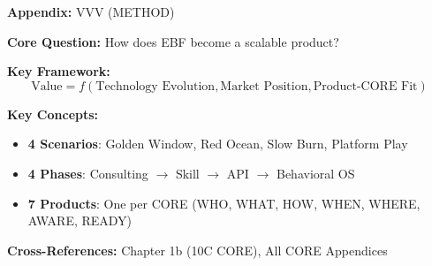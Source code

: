 
\begin{abstract}
This appendix addresses the fundamental strategic question: \textbf{How does EBF transition from consulting methodology to scalable AI-embedded products?} We develop a technological roadmap with four distinct scenarios, analyze EBF's strategic positioning in each, define the product options matrix mapping 10C COREs to revenue models, and chart the productizing journey from today's consulting practice to tomorrow's Behavioral AI platform.
\end{abstract}


\begin{tcolorbox}[colback=blue!5!white, colframe=blue!75!black,
    title=Quick Reference: Appendix UNMAPPED_VVV]
\textbf{Appendix:} VVV (METHOD)


\textbf{Core Question:} How does EBF become a scalable product?

\textbf{Key Framework:}
\begin{equation}
\text{Value} = f(\text{Technology Evolution}, \text{Market Position}, \text{Product-CORE Fit})
\end{equation}

\textbf{Key Concepts:}
\begin{itemize}[nosep]
\item \textbf{4 Scenarios}: Golden Window, Red Ocean, Slow Burn, Platform Play
\item \textbf{4 Phases}: Consulting $\to$ Skill $\to$ API $\to$ Behavioral OS
\item \textbf{7 Products}: One per CORE (WHO, WHAT, HOW, WHEN, WHERE, AWARE, READY)
\end{itemize}

\textbf{Cross-References:} Chapter 1b (10C CORE), All CORE Appendices
\end{tcolorbox}


